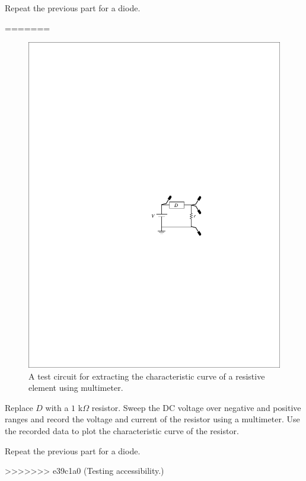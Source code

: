 \documentclass[11pt]{article}
\begin{document}
\begin{question}
\begin{subquestion}{Repeat the previous part for a diode.} 
\answer{}
\end{subquestion}
=======

    \begin{figure}[H]
        \centering
        \includegraphics[scale=1.2,angle=0]{Fig/cir2.pdf}
        \caption{A test circuit for extracting the characteristic curve of a resistive element using multimeter.} \label{fig:cir2}
    \end{figure}

    \begin{subquestion}{Replace $D$ with a $1$ k$\Omega$ resistor. Sweep the DC voltage over negative and positive ranges and record the voltage and current of the resistor using a multimeter. Use the recorded data to plot the characteristic curve of the resistor.}
        \answer{}
    \end{subquestion}

    \begin{subquestion}{Repeat the previous part for a diode.}
        \answer{}
    \end{subquestion}
>>>>>>> e39c1a0 (Testing accessibility.)


\end{question}
\end{document}
